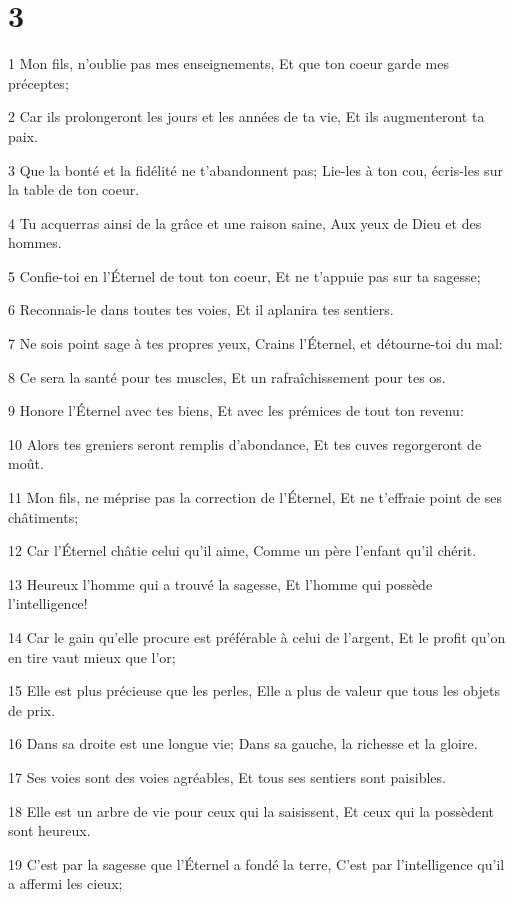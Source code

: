 \chapter{3}

\par 1 Mon fils, n'oublie pas mes enseignements, Et que ton coeur garde mes préceptes;
\par 2 Car ils prolongeront les jours et les années de ta vie, Et ils augmenteront ta paix.
\par 3 Que la bonté et la fidélité ne t'abandonnent pas; Lie-les à ton cou, écris-les sur la table de ton coeur.
\par 4 Tu acquerras ainsi de la grâce et une raison saine, Aux yeux de Dieu et des hommes.
\par 5 Confie-toi en l'Éternel de tout ton coeur, Et ne t'appuie pas sur ta sagesse;
\par 6 Reconnais-le dans toutes tes voies, Et il aplanira tes sentiers.
\par 7 Ne sois point sage à tes propres yeux, Crains l'Éternel, et détourne-toi du mal:
\par 8 Ce sera la santé pour tes muscles, Et un rafraîchissement pour tes os.
\par 9 Honore l'Éternel avec tes biens, Et avec les prémices de tout ton revenu:
\par 10 Alors tes greniers seront remplis d'abondance, Et tes cuves regorgeront de moût.
\par 11 Mon fils, ne méprise pas la correction de l'Éternel, Et ne t'effraie point de ses châtiments;
\par 12 Car l'Éternel châtie celui qu'il aime, Comme un père l'enfant qu'il chérit.
\par 13 Heureux l'homme qui a trouvé la sagesse, Et l'homme qui possède l'intelligence!
\par 14 Car le gain qu'elle procure est préférable à celui de l'argent, Et le profit qu'on en tire vaut mieux que l'or;
\par 15 Elle est plus précieuse que les perles, Elle a plus de valeur que tous les objets de prix.
\par 16 Dans sa droite est une longue vie; Dans sa gauche, la richesse et la gloire.
\par 17 Ses voies sont des voies agréables, Et tous ses sentiers sont paisibles.
\par 18 Elle est un arbre de vie pour ceux qui la saisissent, Et ceux qui la possèdent sont heureux.
\par 19 C'est par la sagesse que l'Éternel a fondé la terre, C'est par l'intelligence qu'il a affermi les cieux;
